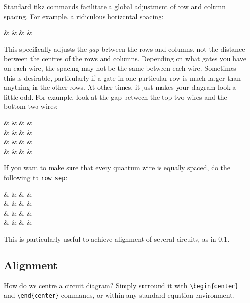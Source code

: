 \documentclass[aps,pra,10pt,nofootinbib]{revtex4-2}
\begin{document}
Standard tikz commands facilitate a global adjustment of row and column spacing. For example, a ridiculous horizontal spacing:
\begin{Code}
  \begin{quantikz}[column sep=1cm]
    &  & \phase{\beta} &  &
  \end{quantikz}
\end{Code}
This specifically adjusts the \emph{gap} between the rows and columns, not the distance between the centres of the rows and columns. Depending on what gates you have on each wire, the spacing may not be the same between each wire. Sometimes this is desirable, particularly if a gate in one particular row is much larger than anything in the other rows. At other times, it just makes your diagram look a little odd. For example, look at the gap between the top two wires and the bottom two wires:
\begin{Code}
  \begin{quantikz}[row sep=0.1cm]
    &  &  &  & \\
    & & \control{} &  & \\
    &  & & & \\
    &  & & &
  \end{quantikz}
\end{Code}
If you want to make sure that every quantum wire is equally spaced, do the following to \verb!row sep!:
\begin{Code}
  \begin{quantikz}[row sep={0.6cm,between origins}]
    &  &  &  & \\
    & & \control{} & & \\
    &  & & & \\
    &  & & &
  \end{quantikz}
\end{Code}
This is particularly useful to achieve alignment of several circuits, as in \ref{sec:align}.


\subsection{Alignment}\label{sec:align}

How do we centre a circuit diagram? Simply surround it with \verb!\begin{center}! and \verb!\end{center}! commands, or within any standard equation environment.
\end{document}
